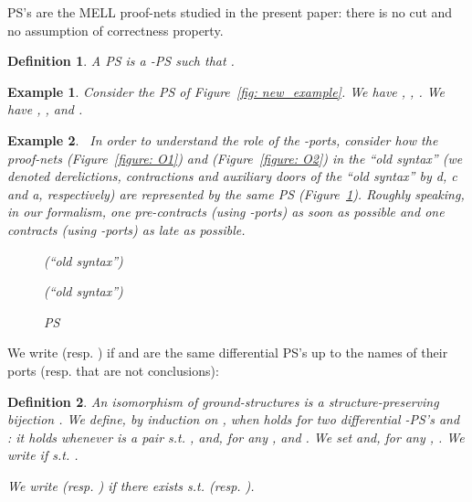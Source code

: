 \documentclass{article}
\theoremstyle{plain}
\newtheorem{definition}{Definition}
\newtheorem{example}{Example}
\newcommand{\scalefactter}{0.33}
\newcommand{\pictter}[1]{\scalebox{\scalefactter}{}}
\begin{document}
PS's are the MELL proof-nets studied in the present paper: there is no cut and no assumption of correctness property.

\begin{definition}\label{defin: PS}
A PS is a -PS  such that .
\end{definition}

\begin{example}
Consider the PS  of Figure~\ref{fig: new_example}. 
We have ,        , . We have , ,  and .
\end{example}

\begin{example}~\label{example: old versus new}
In order to understand the role of the -ports, consider how the proof-nets  (Figure~\ref{figure: O1}) and  (Figure~\ref{figure: O2}) in the ``old syntax'' (we denoted derelictions, contractions and auxiliary doors of the ``old syntax'' by \textsf{d}, \textsf{c} and \textsf{a}, respectively) are represented by the same PS  (Figure~\ref{figure: N}). Roughly speaking, in our formalism, one pre-contracts (using -ports) as soon as possible and one contracts (using -ports) as late as possible.

\begin{figure}
\centering
\begin{minipage}{4.5cm}
\centering
\pictter{O1}
\caption{ (``old syntax'')}
\label{figure: O1}
\end{minipage}\hfill
\begin{minipage}{4.5cm}
\centering
\pictter{O2}
\caption{ (``old syntax'')}
\label{figure: O2}
\end{minipage}
\begin{minipage}{4.5cm}
\centering
\pictter{N}
\caption{PS }
\label{figure: N}
\end{minipage}
\end{figure}
\end{example}



We write  (resp. ) if  and  are the same differential PS's up to the names of their ports (resp. that are not conclusions):

\begin{definition}
An \emph{isomorphism  of ground-structures} is a structure-preserving bijection . We define, by induction on , when  holds for two differential -PS's  and : it holds whenever  is a pair  s.t. ,  and, 
for any , 
 and . 
We set  and, for any , . 
We write  if  s.t. .

We write  (resp. ) if there exists  s.t.  (resp. ).
\end{definition}
\end{document}
